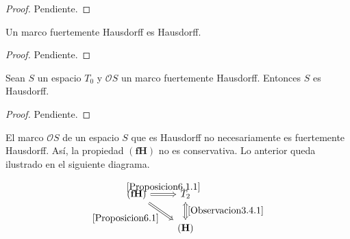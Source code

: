 \begin{proof}
    Pendiente.
\end{proof}

\begin{prop}\label{Proposicion6.1}
    Un marco fuertemente Hausdorff es Hausdorff.
\end{prop}

\begin{proof}
    Pendiente.
\end{proof}

\begin{prop}\label{Proposicion6.1.1}
    Sean $S$ un espacio $T_0$ y $\mathcal{O}S$ un marco fuertemente Hausdorff. Entonces $S$ es Hausdorff.
\end{prop}

\begin{proof}
    Pendiente.
\end{proof}

El marco $\mathcal{O}S$ de un espacio $S$ que es Hausdorff no necesariamente es fuertemente Hausdorff. Así, la propiedad $\mathbf{(fH)}$ no es conservativa. Lo anterior queda ilustrado en el siguiente diagrama.

\[\begin{tikzcd}
	{\mathbf{(fH)}} & {T_2} \\
	& {\mathbf{(H)}}
	\arrow["{\ref{Proposicion6.1.1}}", Rightarrow, from=1-1, to=1-2]
	\arrow["{\ref{Proposicion6.1}}"', Rightarrow, from=1-1, to=2-2]
	\arrow["{\ref{Observacion3.4.1}}", Leftrightarrow, from=1-2, to=2-2]
\end{tikzcd}\]


